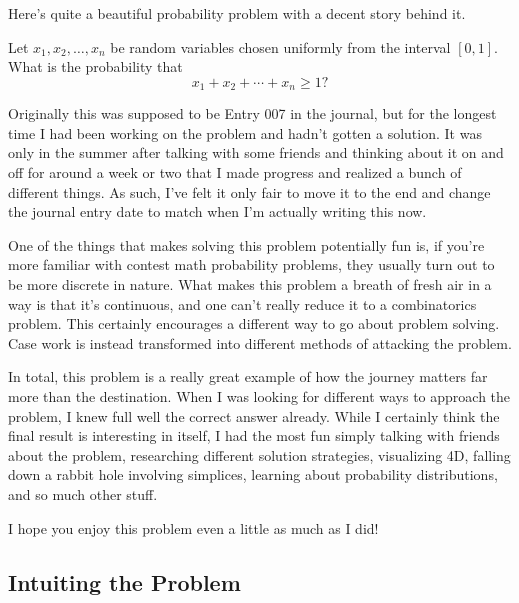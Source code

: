 Here's quite a beautiful probability problem with a decent story behind it.

\begin{blackbox}
    \begin{problem}
        Let \( x_1, x_2, \ldots, x_n \) be random variables chosen uniformly
        from the interval \( \left[0, 1\right] \). What is the probability that
        \[
            x_1 + x_2 + \cdots + x_n \geqslant 1
        ?\]
    \end{problem}
\end{blackbox}

Originally this was supposed to be Entry 007 in the journal, but for the
longest time I had been working on the problem and hadn't gotten a solution. It
was only in the summer after talking with some friends and thinking about it on
and off for around a week or two that I made progress and realized a bunch of
different things. As such, I've felt it only fair to move it to the end and
change the journal entry date to match when I'm actually writing this now.

One of the things that makes solving this problem potentially fun is, if you're
more familiar with contest math probability problems, they usually turn out to
be more discrete in nature. What makes this problem a breath of fresh air in a
way is that it's continuous, and one can't really reduce it to a combinatorics
problem.  This certainly encourages a different way to go about
problem solving. Case work is instead transformed into different methods of
attacking the problem.

In total, this problem is a really great example of how the journey matters far
more than the destination. When I was looking for different ways to approach
the problem, I knew full well the correct answer already. While I certainly
think the final result is interesting in itself, I had the most fun simply
talking with friends about the problem, researching different solution
strategies, visualizing 4D, falling down a rabbit hole involving simplices,
learning about probability distributions, and so much other stuff.

I hope you enjoy this problem even a little as much as I did!


\subsection{Intuiting the Problem}

